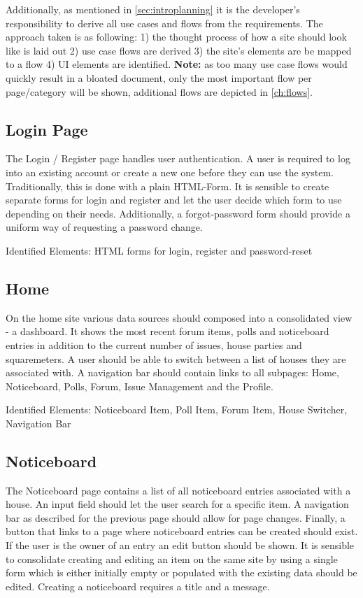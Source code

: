 Additionally, as mentioned in \autoref{sec:introplanning} it is the developer's responsibility to derive all use cases and flows from the requirements. The approach taken is as following: 1) the thought process of how a site should look like is laid out 2) use case flows are derived 3) the site's elements are be mapped to a flow 4) UI elements are identified. \textbf{Note:} as too many use case flows would quickly result in a bloated document, only the most important flow per page/category will be shown, additional flows are depicted in \autoref{ch:flows}.

\subsection{Login Page}
The Login / Register page handles user authentication. A user is required to log into an existing account or create a new one before they can use the system. Traditionally, this is done with a plain HTML-Form. It is sensible to create separate forms for login and register and let the user decide which form to use depending on their needs. Additionally, a forgot-password form should provide a uniform way of requesting a password change. \newline

Identified Elements: HTML forms for login, register and password-reset

\subsection{Home}
On the home site various data sources should composed into a consolidated view - a dashboard. It shows the most recent forum items, polls and noticeboard entries in addition to the current number of issues, house parties and squaremeters. A user should be able to switch between a list of houses they are associated with. A navigation bar should contain links to all subpages: Home, Noticeboard, Polls, Forum, Issue Management and the Profile. \newline

Identified Elements: Noticeboard Item, Poll Item, Forum Item, House Switcher, Navigation Bar

\subsection{Noticeboard}
The Noticeboard page contains a list of all noticeboard entries associated with a house. An input field should let the user search for a specific item. A navigation bar as described for the previous page should allow for page changes. Finally, a button that links to a page where noticeboard entries can be created should exist. If the user is the owner of an entry an edit button should be shown. It is sensible to consolidate creating and editing an item on the same site by using a single form which is either initially empty or populated with the existing data should be edited. Creating a noticeboard requires a title and a message. \newline

